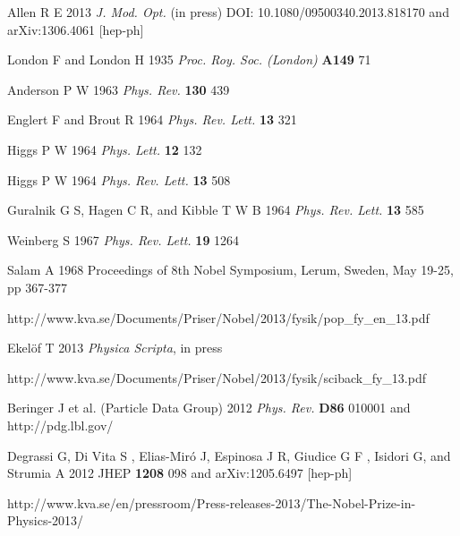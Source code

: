 \documentclass[12pt]{iopart}
\begin{document}
\begin{thebibliography}{99}

 Allen R E 2013 \textit{J. Mod. Opt.} (in press) DOI: 10.1080/09500340.2013.818170 and arXiv:1306.4061 [hep-ph]

 London F and London H 1935 \textit{Proc. Roy. Soc. (London)} \textbf{A149} 71

 Anderson P W 1963 \textit{Phys. Rev.} \textbf{130} 439

 Englert F and Brout R 1964 \textit{Phys. Rev. Lett.} \textbf{13} 321

  Higgs P W 1964 \textit{Phys. Lett.} \textbf{12} 132

 Higgs P W 1964 \textit{Phys. Rev. Lett.} \textbf{13} 508

 Guralnik G S, Hagen C R, and Kibble T W B 1964 \textit{Phys. Rev. Lett.} \textbf{13} 585

 Weinberg S 1967 \textit{Phys. Rev. Lett.} \textbf{19} 1264

 Salam A 1968 Proceedings of 8th Nobel Symposium, Lerum, Sweden, May 19-25, pp 367-377

 http://www.kva.se/Documents/Priser/Nobel/2013/fysik/pop\_fy\_en\_13.pdf

 Ekel\"{o}f T 2013 \textit{Physica Scripta}, in press

 http://www.kva.se/Documents/Priser/Nobel/2013/fysik/sciback\_fy\_13.pdf

 Beringer J et al. (Particle Data Group) 2012 \textit{Phys. Rev.} \textbf{D86} 010001 and http://pdg.lbl.gov/ 

 Degrassi G, Di Vita S , Elias-Mir\'{o} J, Espinosa J R, Giudice G F , Isidori G, and Strumia A 2012 JHEP \textbf{1208} 098 and arXiv:1205.6497 [hep-ph]

 http://www.kva.se/en/pressroom/Press-releases-2013/The-Nobel-Prize-in-Physics-2013/ 

\end{thebibliography}
\end{document}
